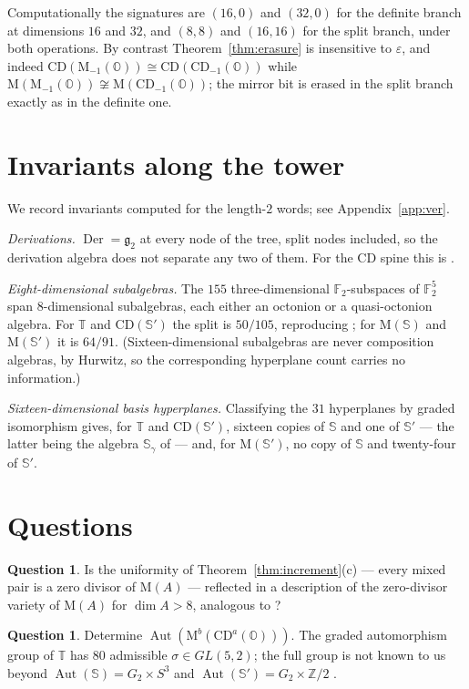 \documentclass[11pt]{amsart}
\theoremstyle{plain}
\theoremstyle{definition}
\newtheorem{question}[theorem]{Question}
\newcommand{\CD}{\mathrm{CD}}
\newcommand{\MM}{\mathrm{M}}
\newcommand{\Der}{\operatorname{Der}}
\newcommand{\Aut}{\operatorname{Aut}}
\newcommand{\OO}{\mathbb{O}}
\newcommand{\FF}{\mathbb{F}}
\newcommand{\Sed}{\mathbb{S}}
\newcommand{\Trig}{\mathbb{T}}
\begin{document}
Computationally the signatures are $(16,0)$ and $(32,0)$ for the definite branch
at dimensions $16$ and $32$, and $(8,8)$ and $(16,16)$ for the split branch,
under both operations. By contrast Theorem~\ref{thm:erasure} is insensitive to
$\varepsilon$, and indeed $\CD(\MM_{-1}(\OO))\cong\CD(\CD_{-1}(\OO))$ while
$\MM(\MM_{-1}(\OO))\not\cong\MM(\CD_{-1}(\OO))$; the mirror bit is erased in the
split branch exactly as in the definite one.

\section{Invariants along the tower}\label{sec:inv}

We record invariants computed for the length-$2$ words; see
Appendix~\ref{app:ver}.

\emph{Derivations.} $\Der=\mathfrak g_2$ at every node of the tree, split nodes
included, so the derivation algebra does not separate any two of them. For the
$\CD$ spine this is \cite{Schafer1954}.

\emph{Eight-dimensional subalgebras.} The $155$ three-dimensional
$\FF_2$-subspaces of $\FF_2^{5}$ span $8$-dimensional subalgebras, each either an
octonion or a quasi-octonion algebra. For $\Trig$ and $\CD(\Sed')$ the split is
$50/105$, reproducing \cite{Cawagas2009}; for $\MM(\Sed)$ and $\MM(\Sed')$ it is
$64/91$. (Sixteen-dimensional subalgebras are never composition algebras, by
Hurwitz, so the corresponding hyperplane count carries no information.)

\emph{Sixteen-dimensional basis hyperplanes.} Classifying the $31$ hyperplanes by
graded isomorphism gives, for $\Trig$ and $\CD(\Sed')$, sixteen copies of $\Sed$
and one of $\Sed'$ --- the latter being the algebra $\Sed_\gamma$ of
\cite{Cawagas2009} --- and, for $\MM(\Sed')$, no copy of $\Sed$ and twenty-four
of $\Sed'$.

\section{Questions}

\begin{question}
Is the uniformity of Theorem~\ref{thm:increment}(c) --- every mixed pair is a
zero divisor of $\MM(A)$ --- reflected in a description of the zero-divisor
variety of $\MM(A)$ for $\dim A>8$, analogous to \cite[Thm.~5.1]{LuiI}?
\end{question}

\begin{question}
Determine $\Aut(\MM^{b}(\CD^{a}(\OO)))$. The graded automorphism group of
$\Trig$ has $80$ admissible $\sigma\in GL(5,2)$; the full group is not known to
us beyond $\Aut(\Sed)=G_2\times S^{3}$ \cite{Brown1967} and
$\Aut(\Sed')=G_2\times\mathbb Z/2$ \cite{LuiI}.
\end{question}
\end{document}

